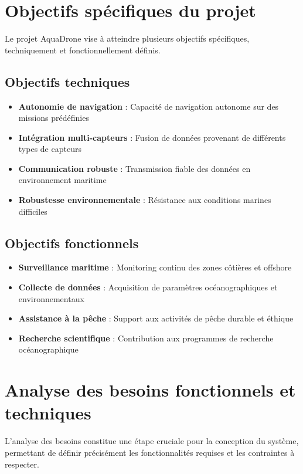 {\section{Objectifs spécifiques du projet}
Le projet AquaDrone vise à atteindre plusieurs objectifs spécifiques, techniquement et fonctionnellement définis.

\subsection{Objectifs techniques}
\begin{itemize}
    \item \textbf{Autonomie de navigation} : Capacité de navigation autonome sur des missions prédéfinies
    \item \textbf{Intégration multi-capteurs} : Fusion de données provenant de différents types de capteurs
    \item \textbf{Communication robuste} : Transmission fiable des données en environnement maritime
    \item \textbf{Robustesse environnementale} : Résistance aux conditions marines difficiles
\end{itemize}

\subsection{Objectifs fonctionnels}
\begin{itemize}
    \item \textbf{Surveillance maritime} : Monitoring continu des zones côtières et offshore
    \item \textbf{Collecte de données} : Acquisition de paramètres océanographiques et environnementaux
    \item \textbf{Assistance à la pêche} : Support aux activités de pêche durable et éthique
    \item \textbf{Recherche scientifique} : Contribution aux programmes de recherche océanographique
\end{itemize}

\section{Analyse des besoins fonctionnels et techniques}
L'analyse des besoins constitue une étape cruciale pour la conception du système, permettant de définir précisément les fonctionnalités requises et les contraintes à respecter.

}
